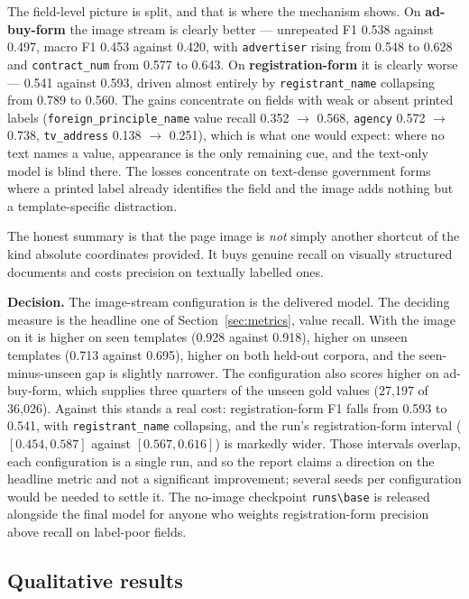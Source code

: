 \documentclass[11pt,a4paper]{article}
\newcommand{\code}[1]{\texttt{\small #1}}
\begin{document}
The field-level picture is split, and that is where the mechanism shows. On \textbf{ad-buy-form}
the image stream is clearly better --- unrepeated F1 0.538 against 0.497, macro F1 0.453 against
0.420, with \code{advertiser} rising from 0.548 to 0.628 and \code{contract\_num} from 0.577 to
0.643. On \textbf{registration-form} it is clearly worse --- 0.541 against 0.593, driven almost
entirely by \code{registrant\_name} collapsing from 0.789 to 0.560. The gains concentrate on
fields with weak or absent printed labels (\code{foreign\_principle\_name} value recall 0.352
$\to$ 0.568, \code{agency} 0.572 $\to$ 0.738, \code{tv\_address} 0.138 $\to$ 0.251), which is what
one would expect: where no text names a value, appearance is the only remaining cue, and the
text-only model is blind there. The losses concentrate on text-dense government forms where a
printed label already identifies the field and the image adds nothing but a template-specific
distraction.

The honest summary is that the page image is \emph{not} simply another shortcut of the kind
absolute coordinates provided. It buys genuine recall on visually structured documents and costs
precision on textually labelled ones.

\textbf{Decision.} The image-stream configuration is the delivered model. The deciding measure is
the headline one of Section~\ref{sec:metrics}, value recall. With the image on it is higher on
seen templates (0.928 against 0.918), higher on unseen templates (0.713 against 0.695), higher on
both held-out corpora, and the seen-minus-unseen gap is slightly narrower. The configuration also
scores higher on ad-buy-form, which supplies three quarters of the unseen gold values (27{,}197 of
36{,}026). Against this stands a real cost: registration-form F1 falls from 0.593 to 0.541, with
\code{registrant\_name} collapsing, and the run's registration-form interval
($[0.454, 0.587]$ against $[0.567, 0.616]$) is markedly wider. Those intervals overlap, each
configuration is a single run, and so the report claims a direction on the headline metric and
not a significant improvement; several seeds per configuration would be needed to settle it. The
no-image checkpoint \code{runs\textbackslash base} is released alongside the final model for
anyone who weights registration-form precision above recall on label-poor fields.

\subsection{Qualitative results}
\end{document}
